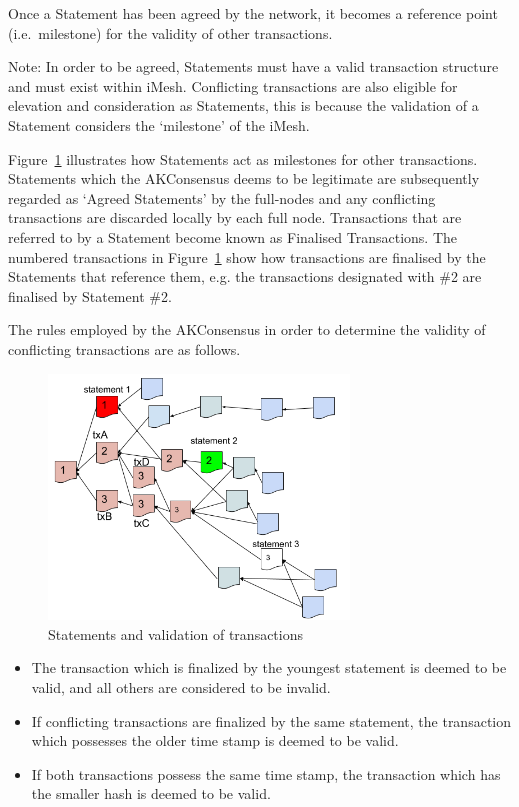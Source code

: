\documentclass[a4paper,10pt,twocolumn]{article}
\begin{document}
Once a Statement has been agreed by the network, it becomes a reference point (i.e.\ milestone) for the validity of other transactions.

Note: In order to be agreed, Statements must have a valid transaction structure and must exist within iMesh.
Conflicting transactions are also eligible for elevation and consideration as Statements, this is because the validation of a Statement 
considers the `milestone' of the iMesh.

Figure~\ref{fig:fba} illustrates how Statements act as milestones for other transactions.
Statements which the AKConsensus deems to be legitimate are subsequently regarded as `Agreed Statements' by the full-nodes 
and any conflicting transactions are discarded locally by each full node. Transactions that are referred to by a Statement become known as 
Finalised Transactions.
The numbered transactions in Figure~\ref{fig:fba} show how transactions are finalised by the Statements that reference them,
e.g. the transactions designated with \#2 are finalised by Statement \#2.

The rules employed by the AKConsensus in order to determine the validity of conflicting transactions are as follows.

 \begin{figure}[ht]
	\begin{center}
	\includegraphics[width=80mm]{fba.png}
	  \caption{Statements and validation of transactions}
    \label{fig:fba}
	\end{center}
 \end{figure}

\begin{itemize}
	\item The transaction which is finalized by the youngest statement is deemed to be valid, and all others are considered to be invalid.
	\item If conflicting transactions are finalized by the same statement, the transaction which possesses the older time stamp is deemed 
	to be valid.
	\item If both transactions possess the same time stamp, the transaction which has the smaller hash is deemed to be valid.
\end{itemize}
\end{document}
